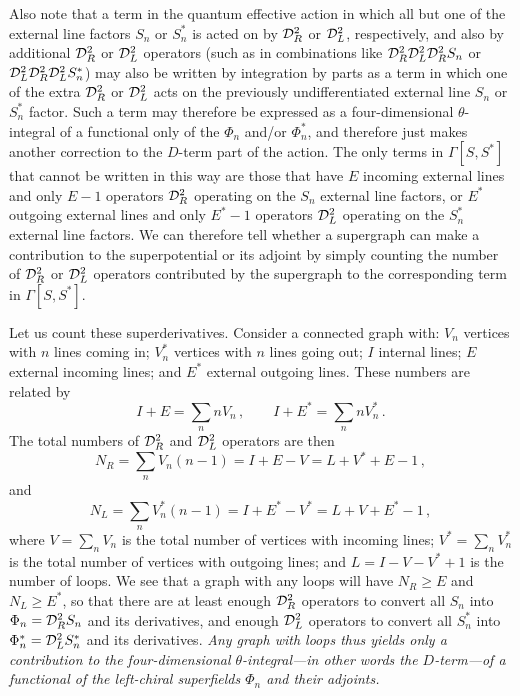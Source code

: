Also note that a term in the quantum effective action in which all but one of
the external line factors \(S_n\) or \(S_n^*\) is acted on by
\(\mathcal{D}_R^2\) or \(\mathcal{D}_L^2\), respectively, and also by additional
\(\mathcal{D}_R^2\) or \(\mathcal{D}_L^2\) operators (such as in combinations like
\(\mathcal{D}_R^2\mathcal{D}_L^2\mathcal{D}_R^2S_n\) or
\(\mathcal{D}_L^2\mathcal{D}_R^2\mathcal{D}_L^2S_n^*\)) may also be written by
integration by parts as a term in which one of the extra \(\mathcal{D}_R^2\) or
\(\mathcal{D}_L^2\) acts on the previously undifferentiated external line
\(S_n\) or \(S_n^*\) factor. Such a term may therefore be expressed as a
four-dimensional \(\theta\)-integral of a functional only of the \(\Phi_n\)
and/or \(\Phi_n^*\), and therefore just makes another correction to the
\(D\)-term part of the action. The only terms in \(\Gamma[S,S^*]\) that
cannot be written in this way are those that have \(E\) incoming external
lines and only \(E-1\) operators \(\mathcal{D}_R^2\) operating on the \(S_n\)
external line factors, or \(E^*\) outgoing external lines and only \(E^*-1\)
operators \(\mathcal{D}_L^2\) operating on the \(S_n^*\) external line factors.
We can therefore tell whether a supergraph can make a contribution to the
superpotential or its adjoint by simply counting the number of
\(\mathcal{D}_R^2\) or \(\mathcal{D}_L^2\) operators contributed by the supergraph
to the corresponding term in \(\Gamma[S,S^*]\).

Let us count these superderivatives. Consider a connected graph with:
\(V_n\) vertices with \(n\) lines coming in; \(V_n^*\) vertices with \(n\)
lines going out; \(I\) internal lines; \(E\) external incoming lines; and
\(E^*\) external outgoing lines. These numbers are related by
\begin{equation}
  I+E=\sum_n nV_n\,,
  \qquad
  I+E^*=\sum_n nV_n^*\,.
  \tag{30.3.2}\label{eq:30.3.2}
\end{equation}
The total numbers of \(\mathcal{D}_R^2\) and \(\mathcal{D}_L^2\) operators are then
\begin{equation}
  N_R
  =\sum_nV_n(n-1)
  =I+E-V
  =L+V^*+E-1\,,
  \tag{30.3.3}\label{eq:30.3.3}
\end{equation}
and
\begin{equation}
  N_L
  =\sum_nV_n^*(n-1)
  =I+E^*-V^*
  =L+V+E^*-1\,,
  \tag{30.3.4}\label{eq:30.3.4}
\end{equation}
where \(V=\sum_nV_n\) is the total number of vertices with incoming lines;
\(V^*=\sum_nV_n^*\) is the total number of vertices with outgoing lines; and
\(L=I-V-V^*+1\) is the number of loops. We see that a graph with any loops
will have \(N_R\geq E\) and \(N_L\geq E^*\), so that there are at least enough
\(\mathcal{D}_R^2\) operators to convert all \(S_n\) into
\(\Phi_n=\mathcal{D}_R^2S_n\) and its derivatives, and enough
\(\mathcal{D}_L^2\) operators to convert all \(S_n^*\) into
\(\Phi_n^*=\mathcal{D}_L^2S_n^*\) and its derivatives.
\emph{Any graph with loops thus yields only a contribution to the
four-dimensional \(\theta\)-integral---in other words the \(D\)-term---of a
functional of the left-chiral superfields \(\Phi_n\) and their adjoints.}

